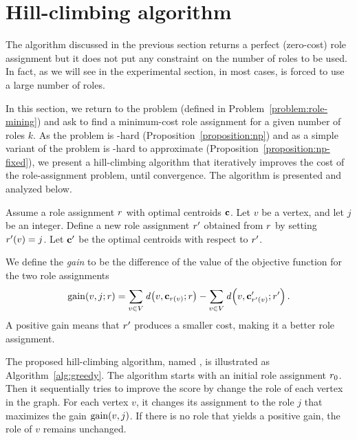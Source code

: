 \section{Hill-climbing algorithm}
\label{section:greedy}

The algorithm discussed in the previous section
returns a perfect (zero-cost) role assignment
but it does not put any constraint on the number of roles to be used.
In fact, as we will see in the experimental section, 
in most cases, \algperfect is forced to use a large number of roles. 

In this section, we return to the \prbrm problem
(defined in Problem~\ref{problem:role-mining})
and ask to find a minimum-cost role assignment
for a given number of roles $k$.
As the \prbrm problem is \np-hard (Proposition~\ref{proposition:np}) and
as a simple variant of the problem is \np-hard to approximate (Proposition~\ref{proposition:np-fixed}), 
we present a hill-climbing algorithm
that iteratively improves the cost of the role-assignment problem, 
until convergence.
The algorithm is presented and analyzed below.

Assume a role assignment $r$ with optimal centroids $\mathbf{c}$. 
Let $v$ be a vertex, and let $j$ be an integer.
Define a new role assignment $r'$ obtained from $r$ by setting $r'(v) = j$.
Let $\mathbf{c}'$ be the optimal centroids with respect to $r'$.

We define the \emph{gain} to be the difference
of the value of the objective function for the two role assignments 
\[
\gain{v, j; \role} = 
	\sum_{v \in V} \dist{v, \centroid_{\role(v)}; \role} - \sum_{v \in V} \dist{v, \centroid'_{\role'(v)}; \role'}.
\]
A positive gain means that $r'$ produces a smaller cost, making it a better role assignment.

\iffalse
i -> j
\[
	- c_i\norm{\centroid_i}^2 + (c_i - 1)\norm{\centroid_i'}^2
	+ c_j\norm{\centroid_j}^2 - (c_i + 1)\norm{\centroid_j'}^2
\]

\[
	+ \prof{w}_i^2  -  (\prof{w}_i - 1)^2
	- \prof{w}_j^2  +  (\prof{w}_j - 1)^2
\]

\[
	2\prof{w}_i - 2\prof{w}_j 
\]

\[
	-c_\ell ((\centroid_\ell)^2_i - (\centroid_\ell')^2_i
	-(\centroid_\ell)^2_j + (\centroid_\ell')^2_j)
\]

\[
	- 2(\centroid_\ell)_i  + 2(\centroid_\ell)_j  
\]
\fi

The proposed hill-climbing algorithm,
named \alggreedy, 
is illustrated as Algorithm~\ref{alg:greedy}. 
The algorithm starts with an initial role assignment ${r}_{0}$.
Then it sequentially tries to improve the score by change the role of each vertex in the graph.
For each vertex $v$, it changes its assignment to the role $j$
that maximizes the gain $\gain{v, j}$. 
If there is no role that yields a positive gain, 
the role of $v$ remains unchanged.

